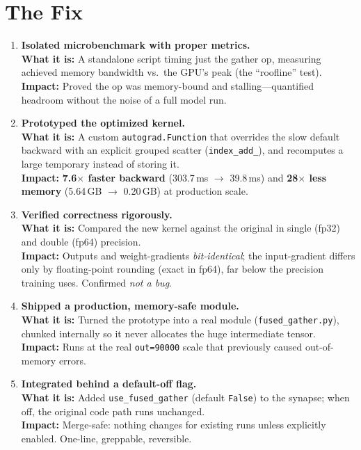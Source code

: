 \documentclass[11pt]{article}
\newcommand{\what}[1]{\textbf{What it is:} #1}
\newcommand{\impact}[1]{\textbf{Impact:} #1}
\begin{document}
\section{The Fix}

\begin{enumerate}[leftmargin=*, resume]

\item \textbf{Isolated microbenchmark with proper metrics.}\\
\what{A standalone script timing just the gather op, measuring achieved memory bandwidth vs.\
the GPU's peak (the ``roofline'' test).}\\
\impact{Proved the op was memory-bound and stalling---quantified headroom without the noise of
a full model run.}

\item \textbf{Prototyped the optimized kernel.}\\
\what{A custom \texttt{autograd.Function} that overrides the slow default backward with an
explicit grouped scatter (\texttt{index\_add\_}), and recomputes a large temporary instead of
storing it.}\\
\impact{\textbf{7.6$\times$ faster backward} (303.7\,ms $\to$ 39.8\,ms) and \textbf{28$\times$
less memory} (5.64\,GB $\to$ 0.20\,GB) at production scale.}

\item \textbf{Verified correctness rigorously.}\\
\what{Compared the new kernel against the original in single (fp32) and double (fp64) precision.}\\
\impact{Outputs and weight-gradients \emph{bit-identical}; the input-gradient differs only by
floating-point rounding (exact in fp64), far below the precision training uses. Confirmed
\emph{not a bug}.}

\item \textbf{Shipped a production, memory-safe module.}\\
\what{Turned the prototype into a real module (\texttt{fused\_gather.py}), chunked internally so
it never allocates the huge intermediate tensor.}\\
\impact{Runs at the real \texttt{out=90000} scale that previously caused out-of-memory errors.}

\item \textbf{Integrated behind a default-off flag.}\\
\what{Added \texttt{use\_fused\_gather} (default \texttt{False}) to the synapse; when off, the
original code path runs unchanged.}\\
\impact{Merge-safe: nothing changes for existing runs unless explicitly enabled. One-line,
greppable, reversible.}


\end{enumerate}
\end{document}
